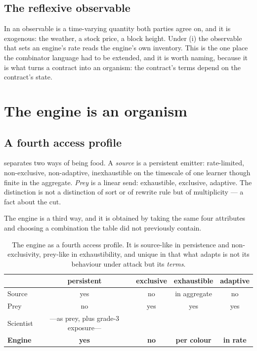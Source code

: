 \documentclass[11pt]{article}
\theoremstyle{plain}
\theoremstyle{definition}
\theoremstyle{remark}
\begin{document}
\subsection{The reflexive observable}

In \cite{SPJ2000} an observable is a time-varying quantity both parties
agree on, and it is exogenous: the weather, a stock price, a block height.
Under (i) the observable that sets an engine's rate reads the engine's own
inventory. This is the one place the combinator language had to be
extended, and it is worth naming, because it is what turns a contract into
an organism: the contract's terms depend on the contract's state.

\section{The engine is an organism}
\label{sec:organism}

\subsection{A fourth access profile}

\cite[\S10]{scientist} separates two ways of being food. A \emph{source} is
a persistent emitter: rate-limited, non-exclusive, non-adaptive,
inexhaustible on the timescale of one learner though finite in the
aggregate. \emph{Prey} is a linear send: exhaustible, exclusive, adaptive.
The distinction is not a distinction of sort or of rewrite rule but of
multiplicity --- a fact about the cut.

The engine is a third way, and it is obtained by taking the same four
attributes and choosing a combination the table did not previously contain.

\begin{table}[t]
\centering\small
\begin{tabular}{@{}lcccc@{}}
\toprule
& \textbf{persistent} & \textbf{exclusive} & \textbf{exhaustible}
& \textbf{adaptive} \\
\midrule
Source          & yes & no  & in aggregate & no \\
Prey            & no  & yes & yes          & yes \\
Scientist       & ---as prey, plus grade-3 exposure--- & & & \\
\textbf{Engine} & \textbf{yes} & \textbf{no} & \textbf{per colour}
                & \textbf{in rate} \\
\bottomrule
\end{tabular}
\caption{The engine as a fourth access profile. It is source-like in
persistence and non-exclusivity, prey-like in exhaustibility, and unique
in that what adapts is not its behaviour under attack but its
\emph{terms}.}
\label{tab:profiles}
\end{table}
\end{document}
